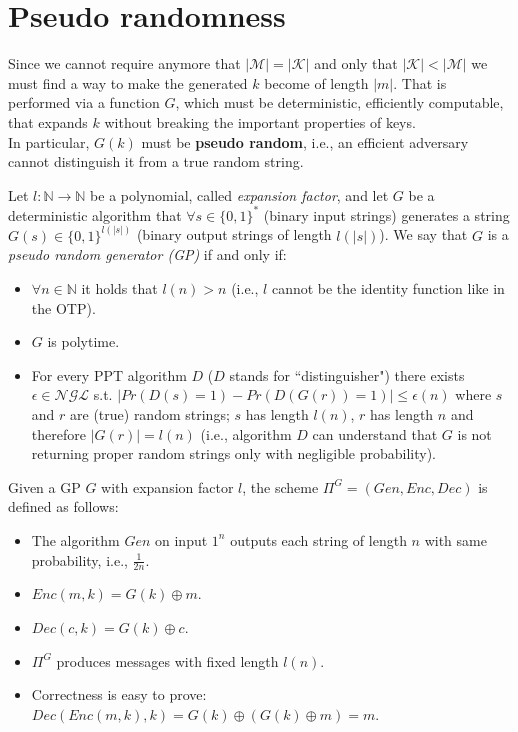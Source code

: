 \documentclass[../main]{subfiles}
\begin{document}
\section{Pseudo randomness}
Since we cannot require anymore that $|\mathcal{M}| = |\mathcal{K}|$ and only that $|\mathcal{K}| < |\mathcal{M}|$ we must find a way to make the generated $k$ become of length $|m|$.
That is performed via a function $G$, which must be deterministic, efficiently computable, that expands $k$ without breaking the important properties of keys.\\
In particular, $G(k)$ must be \textbf{pseudo random}, i.e., an efficient adversary cannot distinguish it from a true random string.

\begin{definition}
    Let $l:\mathbb{N}\rightarrow{}\mathbb{N}$ be a polynomial, called \textit{expansion factor}, and let $G$ be a deterministic algorithm that $\forall{} s \in{} \{0,1\}^*$ (binary input strings) generates a string $G(s) \in{} \{0,1\}^{l(|s|)}$ (binary output strings of length $l(|s|)$).
    We say that $G$ is a \textit{pseudo random generator (GP)} if and only if:
    \begin{itemize}
        \item $\forall{}n \in{} \mathbb{N}$ it holds that $l(n) > n$ (i.e., $l$ cannot be the identity function like in the OTP).
        \item $G$ is polytime.
        \item For every PPT algorithm $D$ ($D$ stands for ``distinguisher") there exists $\epsilon{} \in{} \mathcal{NGL}$ s.t. $|Pr(D(s) = 1) - Pr(D(G(r)) = 1)| \le{} \epsilon(n)$ where $s$ and $r$ are (true) random strings; $s$ has length $l(n)$, $r$ has length $n$ and therefore $|G(r)|=l(n)$ (i.e., algorithm $D$ can understand that $G$ is not returning proper random strings only with negligible probability).
    \end{itemize}
\end{definition}

\begin{definition}
    Given a GP $G$ with expansion factor $l$, the scheme $\Pi^G = (Gen,Enc,Dec)$ is defined as follows:
    \begin{itemize}
        \item The algorithm $Gen$ on input $1^n$ outputs each string of length $n$ with same probability, i.e., $\frac{1}{2n}$.
        \item $Enc(m,k)=G(k)\oplus{}m$.
        \item $Dec(c,k)=G(k)\oplus{}c$.
        \item $\Pi^G$ produces messages with fixed length $l(n)$.
        \item Correctness is easy to prove: $Dec(Enc(m,k),k)=G(k)\oplus(G(k)\oplus m)=m$.
    \end{itemize}
\end{definition}
\end{document}
